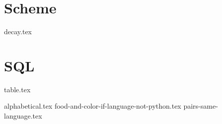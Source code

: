 \documentclass{exam}
\begin{document}
\section{Scheme}
\begin{questions}
{decay.tex}
\end{questions}

\section{SQL}
{table.tex}
\begin{questions}
{alphabetical.tex}
{food-and-color-if-language-not-python.tex}
{pairs-same-language.tex}
\end{questions}
\end{document}
